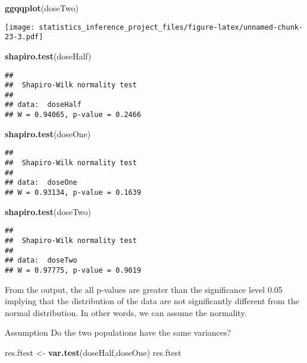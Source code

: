 \documentclass[]{article}
\newenvironment{Shaded}{\begin{snugshade}}{\end{snugshade}}
\newcommand{\KeywordTok}[1]{\textcolor[rgb]{0.13,0.29,0.53}{\textbf{#1}}}
\newcommand{\StringTok}[1]{\textcolor[rgb]{0.31,0.60,0.02}{#1}}
\newcommand{\NormalTok}[1]{#1}
\begin{document}
\begin{Shaded}
\begin{Highlighting}[]
\KeywordTok{ggqqplot}\NormalTok{(doseTwo)}
\end{Highlighting}
\end{Shaded}

\texttt{[image: statistics\_inference\_project\_files/figure-latex/unnamed-chunk-23-3.pdf]}

\begin{Shaded}
\begin{Highlighting}[]
\KeywordTok{shapiro.test}\NormalTok{(doseHalf)}
\end{Highlighting}
\end{Shaded}

\begin{verbatim}
## 
##  Shapiro-Wilk normality test
## 
## data:  doseHalf
## W = 0.94065, p-value = 0.2466
\end{verbatim}

\begin{Shaded}
\begin{Highlighting}[]
\KeywordTok{shapiro.test}\NormalTok{(doseOne)}
\end{Highlighting}
\end{Shaded}

\begin{verbatim}
## 
##  Shapiro-Wilk normality test
## 
## data:  doseOne
## W = 0.93134, p-value = 0.1639
\end{verbatim}

\begin{Shaded}
\begin{Highlighting}[]
\KeywordTok{shapiro.test}\NormalTok{(doseTwo)}
\end{Highlighting}
\end{Shaded}

\begin{verbatim}
## 
##  Shapiro-Wilk normality test
## 
## data:  doseTwo
## W = 0.97775, p-value = 0.9019
\end{verbatim}

From the output, the all p-values are greater than the significance
level 0.05 implying that the distribution of the data are not
significantly different from the normal distribution. In other words, we
can assume the normality.

Assumption Do the two populations have the same variances?

\begin{Shaded}
\begin{Highlighting}[]
\NormalTok{res.ftest <-}\StringTok{ }\KeywordTok{var.test}\NormalTok{(doseHalf,doseOne)}
\NormalTok{res.ftest}
\end{Highlighting}
\end{Shaded}
\end{document}
